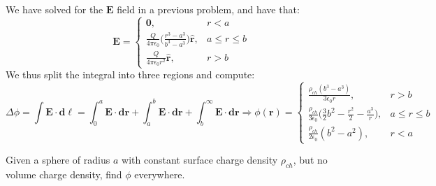 \documentclass[crop=false,class=article,oneside]{standalone}
\begin{document}
        We have solved for the $\mathbf{E}$ field in
        a previous problem, and have that:
        \begin{equation*}
            \mathbf{E}
            =
            \begin{cases}
                \mathbf{0},
                &r<a\\
                \frac{Q}{4\pi \epsilon_0}
                \Big(\frac{r^3-a^3}{b^3-a^3}\Big)
                \hat{\mathbf{r}},
                &a\leq{r}\leq{b}\\
                \frac{Q}{4\pi\epsilon_{0}r^{2}}
                \hat{\mathbf{r}},
                &r>b
            \end{cases}    
        \end{equation*}
        We thus split the integral
        into three regions and compute:
        \begin{equation*}
            \Delta\phi
            =\int\mathbf{E}\cdot\mathbf{d\ell}
            =\int_{0}^{a}\mathbf{E}\cdot\mathbf{dr}
            +\int_{a}^{b}\mathbf{E}\cdot\mathbf{dr}
            +\int_{b}^{\infty}\mathbf{E}\cdot \mathbf{dr}    
            \Rightarrow\phi(\mathbf{r})
            =
            \begin{cases}
                \frac{\rho_{ch}(b^{3}-a^{3})}
                     {3\epsilon_{0}r},
                &r>b\\
                \frac{\rho_{ch}}{3\epsilon_{0}}\Big(
                    \frac{3}{2}b^{2}
                    -\frac{r^2}{2}
                    -\frac{a^3}{r}
                \Big),&a\leq{r}\leq{b}\\
                \frac{\rho_{ch}}{2\epsilon_0}(b^2-a^2),
                &r<a
            \end{cases}
        \end{equation*}
    \begin{problem}[Wangsness 5-14]
        Given a sphere of radius $a$ with constant
        surface charge density $\rho_{ch}$, but no
        volume charge density, find $\phi$ everywhere.
    \end{problem}
\end{document}
